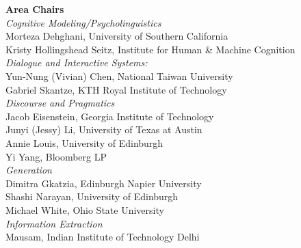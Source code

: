 {\bf Area Chairs} \\
                \emph{Cognitive Modeling/Psycholinguistics} \\
                                    \hspace*{0.2in} Morteza Dehghani, University of Southern California \\
                                    \hspace*{0.2in} Kristy Hollingshead Seitz, Institute for Human \& Machine Cognition \\
                            \emph{Dialogue and Interactive Systems:} \\
                                    \hspace*{0.2in} Yun-Nung (Vivian) Chen, National Taiwan University \\
                                    \hspace*{0.2in} Gabriel Skantze, KTH Royal Institute of Technology \\
                            \emph{Discourse and Pragmatics} \\
                                    \hspace*{0.2in} Jacob Eisenstein, Georgia Institute of Technology \\
                                    \hspace*{0.2in} Junyi (Jessy) Li, University of Texas at Austin \\
                                    \hspace*{0.2in} Annie Louis, University of Edinburgh \\
                                    \hspace*{0.2in} Yi Yang, Bloomberg LP \\
                            \emph{Generation} \\
                                    \hspace*{0.2in} Dimitra Gkatzia, Edinburgh Napier University \\
                                    \hspace*{0.2in} Shashi Narayan, University of Edinburgh \\
                                    \hspace*{0.2in} Michael White, Ohio State University \\
                            \emph{Information Extraction} \\
                                    \hspace*{0.2in} Mausam, Indian Institute of Technology Delhi \\
